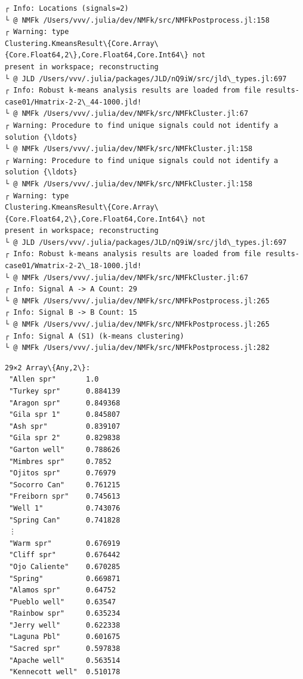 \documentclass[11pt]{article}
\begin{document}
    \begin{Verbatim}[commandchars=\\\{\}]
┌ Info: Locations (signals=2)
└ @ NMFk /Users/vvv/.julia/dev/NMFk/src/NMFkPostprocess.jl:158
┌ Warning: type
Clustering.KmeansResult\{Core.Array\{Core.Float64,2\},Core.Float64,Core.Int64\} not
present in workspace; reconstructing
└ @ JLD /Users/vvv/.julia/packages/JLD/nQ9iW/src/jld\_types.jl:697
┌ Info: Robust k-means analysis results are loaded from file results-
case01/Hmatrix-2-2\_44-1000.jld!
└ @ NMFk /Users/vvv/.julia/dev/NMFk/src/NMFkCluster.jl:67
┌ Warning: Procedure to find unique signals could not identify a solution {\ldots}
└ @ NMFk /Users/vvv/.julia/dev/NMFk/src/NMFkCluster.jl:158
┌ Warning: Procedure to find unique signals could not identify a solution {\ldots}
└ @ NMFk /Users/vvv/.julia/dev/NMFk/src/NMFkCluster.jl:158
┌ Warning: type
Clustering.KmeansResult\{Core.Array\{Core.Float64,2\},Core.Float64,Core.Int64\} not
present in workspace; reconstructing
└ @ JLD /Users/vvv/.julia/packages/JLD/nQ9iW/src/jld\_types.jl:697
┌ Info: Robust k-means analysis results are loaded from file results-
case01/Wmatrix-2-2\_18-1000.jld!
└ @ NMFk /Users/vvv/.julia/dev/NMFk/src/NMFkCluster.jl:67
┌ Info: Signal A -> A Count: 29
└ @ NMFk /Users/vvv/.julia/dev/NMFk/src/NMFkPostprocess.jl:265
┌ Info: Signal B -> B Count: 15
└ @ NMFk /Users/vvv/.julia/dev/NMFk/src/NMFkPostprocess.jl:265
┌ Info: Signal A (S1) (k-means clustering)
└ @ NMFk /Users/vvv/.julia/dev/NMFk/src/NMFkPostprocess.jl:282
    \end{Verbatim}

    
    \begin{Verbatim}[commandchars=\\\{\}]
29×2 Array\{Any,2\}:
 "Allen spr"       1.0
 "Turkey spr"      0.884139
 "Aragon spr"      0.849368
 "Gila spr 1"      0.845807
 "Ash spr"         0.839107
 "Gila spr 2"      0.829838
 "Garton well"     0.788626
 "Mimbres spr"     0.7852
 "Ojitos spr"      0.76979
 "Socorro Can"     0.761215
 "Freiborn spr"    0.745613
 "Well 1"          0.743076
 "Spring Can"      0.741828
 ⋮                 
 "Warm spr"        0.676919
 "Cliff spr"       0.676442
 "Ojo Caliente"    0.670285
 "Spring"          0.669871
 "Alamos spr"      0.64752
 "Pueblo well"     0.63547
 "Rainbow spr"     0.635234
 "Jerry well"      0.622338
 "Laguna Pbl"      0.601675
 "Sacred spr"      0.597838
 "Apache well"     0.563514
 "Kennecott well"  0.510178
    \end{Verbatim}

    
    
\end{document}
